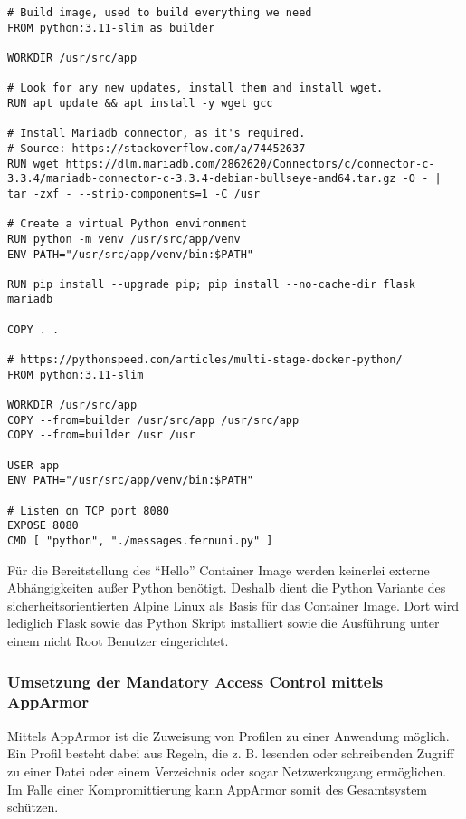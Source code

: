 \begin{verbatim}
# Build image, used to build everything we need
FROM python:3.11-slim as builder

WORKDIR /usr/src/app

# Look for any new updates, install them and install wget.
RUN apt update && apt install -y wget gcc

# Install Mariadb connector, as it's required.
# Source: https://stackoverflow.com/a/74452637
RUN wget https://dlm.mariadb.com/2862620/Connectors/c/connector-c-3.3.4/mariadb-connector-c-3.3.4-debian-bullseye-amd64.tar.gz -O - | tar -zxf - --strip-components=1 -C /usr

# Create a virtual Python environment
RUN python -m venv /usr/src/app/venv
ENV PATH="/usr/src/app/venv/bin:$PATH"

RUN pip install --upgrade pip; pip install --no-cache-dir flask mariadb

COPY . .

# https://pythonspeed.com/articles/multi-stage-docker-python/
FROM python:3.11-slim

WORKDIR /usr/src/app
COPY --from=builder /usr/src/app /usr/src/app
COPY --from=builder /usr /usr

USER app
ENV PATH="/usr/src/app/venv/bin:$PATH"

# Listen on TCP port 8080
EXPOSE 8080
CMD [ "python", "./messages.fernuni.py" ]
\end{verbatim}

Für die Bereitstellung des \enquote{Hello} Container Image werden keinerlei externe Abhängigkeiten außer Python benötigt. Deshalb dient die Python Variante des sicherheitsorientierten Alpine Linux als Basis für das Container Image. Dort wird lediglich Flask sowie das Python Skript installiert sowie die Ausführung unter einem nicht Root Benutzer eingerichtet.

\subsubsection{Umsetzung der Mandatory Access Control mittels AppArmor}\label{kap:installation_apparmor}

Mittels AppArmor ist die Zuweisung von Profilen zu einer Anwendung möglich. Ein Profil besteht dabei aus Regeln, die z. B. lesenden oder schreibenden Zugriff zu einer Datei oder einem Verzeichnis oder sogar Netzwerkzugang ermöglichen. Im Falle einer Kompromittierung kann AppArmor somit des Gesamtsystem schützen.

